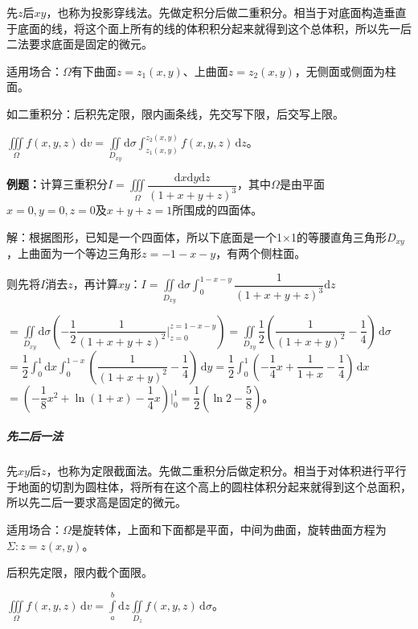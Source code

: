 \documentclass[UTF8, 12pt]{ctexart}
\begin{document}
        先$z$后$xy$，也称为投影穿线法。先做定积分后做二重积分。相当于对底面构造垂直于底面的线，将这个面上所有的线的体积积分起来就得到这个总体积，所以先一后二法要求底面是固定的微元。

        适用场合：$\Omega$有下曲面$z=z_1(x,y)$、上曲面$z=z_2(x,y)$，无侧面或侧面为柱面。

        如二重积分：后积先定限，限内画条线，先交写下限，后交写上限。

        $\iiint\limits_\Omega f(x,y,z)\,\textrm{d}v=\iint\limits_{D_{xy}}\textrm{d}\sigma\int_{z_1(x,y)}^{z_2(x,y)}f(x,y,z)\,\textrm{d}z$。

        \textbf{例题：}计算三重积分$I=\displaystyle{\iiint\limits_\Omega\dfrac{\textrm{d}x\textrm{d}y\textrm{d}z}{(1+x+y+z)^3}}$，其中$\Omega$是由平面$x=0,y=0,z=0$及$x+y+z=1$所围成的四面体。

        解：根据图形，已知是一个四面体，所以下底面是一个1×1的等腰直角三角形$D_{xy}$，上曲面为一个等边三角形$z=-1-x-y$，有两个侧柱面。

        则先将$I$消去$z$，再计算$xy$：$I=\displaystyle{\iint\limits_{D_{xy}}\textrm{d}\sigma\int_0^{1-x-y}\dfrac{1}{(1+x+y+z)^3}\textrm{d}z}$

        $=\displaystyle{\iint\limits_{D_{xy}}\textrm{d}\sigma\left(-\dfrac{1}{2}\dfrac{1}{(1+x+y+z)^2}\bigg|_{z=0}^{z=1-x-y}\right)}=\displaystyle{\iint\limits_{D_{xy}}\dfrac{1}{2}\left(\dfrac{1}{(1+x+y)^2}-\dfrac{1}{4}\right)\,\textrm{d}\sigma}$\\$=\dfrac{1}{2}\int_0^1\textrm{d}x\int_0^{1-x}\left(\dfrac{1}{(1+x+y)^2}-\dfrac{1}{4}\right)\,\textrm{d}y=\dfrac{1}{2}\displaystyle{\int_0^1\left(-\dfrac{1}{4}x+\dfrac{1}{1+x}-\dfrac{1}{4}\right)\,\textrm{d}x}$\\$=\left(-\dfrac{1}{8}x^2+\ln(1+x)-\dfrac{1}{4}x\right)\bigg|_0^1=\dfrac{1}{2}\left(\ln2-\dfrac{5}{8}\right)$。

        \subparagraph{先二后一法} \leavevmode \medskip

        先$xy$后$z$，也称为定限截面法。先做二重积分后做定积分。相当于对体积进行平行于地面的切割为圆柱体，将所有在这个高上的圆柱体积分起来就得到这个总面积，所以先二后一要求高是固定的微元。

        适用场合：$\Omega$是旋转体，上面和下面都是平面，中间为曲面，旋转曲面方程为$\Sigma:z=z(x,y)$。

        后积先定限，限内截个面限。

        $\iiint\limits_\Omega f(x,y,z)\,\textrm{d}v=\int\limits_a^b\textrm{d}z\iint\limits_{D_z}f(x,y,z)\,\textrm{d}\sigma$。
\end{document}
